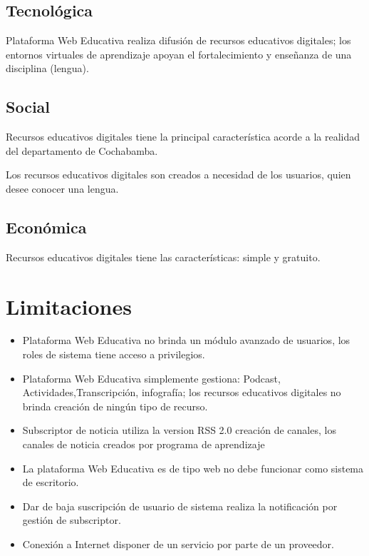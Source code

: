\subsection{Tecnológica}

Plataforma Web Educativa realiza difusión de recursos educativos digitales;
los entornos virtuales de aprendizaje apoyan el fortalecimiento y enseñanza de
una disciplina (lengua).

\subsection{Social}

Recursos educativos digitales tiene la principal característica acorde a la
realidad del departamento de Cochabamba.

Los recursos educativos digitales son creados a necesidad de los usuarios,
quien desee conocer una lengua.

\subsection{Económica}

Recursos educativos digitales tiene las características: simple y gratuito.

\section{Limitaciones}

\begin{itemize}

\item Plataforma Web Educativa no brinda un módulo avanzado de usuarios, los
roles de sistema tiene acceso a privilegios.

\item Plataforma Web Educativa simplemente gestiona: Podcast, Actividades,Transcripción,
infografía; los recursos educativos digitales no brinda creación de ningún
tipo de recurso.

\item Subscriptor de noticia utiliza la version RSS 2.0 creación de canales,
los canales de noticia creados por programa de aprendizaje

\item La plataforma Web Educativa es de tipo web no debe funcionar como sistema
de escritorio.

\item Dar de baja suscripción de usuario de sistema realiza la notificación
por gestión de subscriptor.

\item Conexión a Internet disponer de un servicio por parte de un proveedor.

\end{itemize}